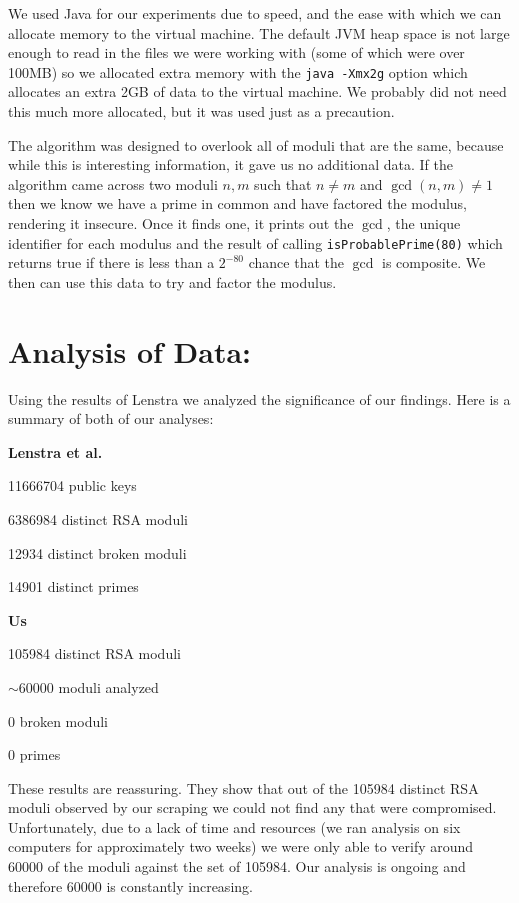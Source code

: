 \documentclass[11pt,twoside]{article}
\newcommand{\ty}[1]{\texttt{#1}}
\begin{document}
\begin{multicols}{2}
We used Java for our experiments due to speed, and the ease with which we can
allocate memory to the virtual machine. The default JVM heap space is not large
enough to read in the files we were working with (some of which were over 100MB)
so we allocated extra memory with the \ty{java -Xmx2g} option which allocates an
extra 2GB of data to the virtual machine. We probably did not need this much
more allocated, but it was used just as a precaution.

The algorithm was designed to overlook all of moduli that are the same, because
while this is interesting information, it gave us no additional data. If the
algorithm came across two moduli $n,m$ such that $n \neq m$ and $\gcd(n,m) \neq
1$ then we know we have a prime in common and have factored the modulus,
rendering it insecure. Once it finds one, it prints out the $\gcd$, the unique
identifier for each modulus and the result of calling \ty{isProbablePrime(80)}
which returns true if there is less than a $2^{-80}$ chance that the $\gcd$ is
composite. We then can use this data to try and factor the modulus.

\section{Analysis of Data:}
Using the results of Lenstra we analyzed the significance
of our findings. Here is a summary of both of our analyses:

\textbf{Lenstra et al.}
\begin{compactitem}
\item 11666704 public keys
\item 6386984 distinct RSA moduli
\item 12934 distinct broken moduli
\item 14901 distinct primes
\end{compactitem}

\break
\textbf{Us}
\begin{compactitem}
\item 105984 distinct RSA moduli
\item $\sim$60000 moduli analyzed
\item 0 broken moduli
\item 0 primes
\end{compactitem}

These results are reassuring. They show that out of the 105984 distinct RSA
moduli observed by our scraping we could not find any that were compromised.
Unfortunately, due to a lack of time and resources (we ran analysis on six
computers for approximately two weeks) we were only able to verify around 60000
of the moduli against the set of 105984. Our analysis is ongoing and therefore
60000 is constantly increasing. 


\end{multicols}
\end{document}
